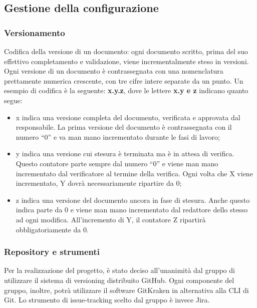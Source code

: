 \subsection{Gestione della configurazione}

\subsubsection{Versionamento}
Codifica della versione di un documento:{\Gruppo}
ogni documento scritto, prima del suo effettivo completamento e validazione, viene incrementalmente steso in versioni. Ogni versione di un documento è contrassegnata con una nomenclatura prettamente numerica crescente, con tre cifre intere separate da un punto. Un esempio di codifica è la seguente: \textbf{x.y.z}, dove le lettere \textbf{x.y e z} indicano quanto segue:
\begin{itemize}
	\item x indica una versione completa del documento, verificata e approvata dal responsabile. La prima versione del documento è contrassegnata con il numero “0” e va man mano incrementato durante le fasi di lavoro;
	\item y indica una versione cui stesura è terminata ma è in attesa di verifica. Questo contatore parte sempre dal numero “0” e viene man mano incrementato dal verificatore al termine della verifica. Ogni volta che X viene incrementato, Y dovrà necessariamente ripartire da 0;
	\item z indica una versione del documento ancora in fase di stesura. Anche questo indica parte da 0 e viene man mano incrementato dal redattore dello stesso ad ogni modifica. All’incremento di Y, il contatore Z ripartirà obbligatoriamente da 0.
	\end{itemize}

\subsubsection{Repository e strumenti}
Per la realizzazione del progetto, è stato deciso all’unanimità dal gruppo di utilizzare il sistema di versioning distribuito GitHub. Ogni componente del gruppo, inoltre, potrà utilizzare il software GitKraken in alternativa alla CLI di Git. Lo strumento di issue-tracking scelto dal gruppo è invece Jira.

